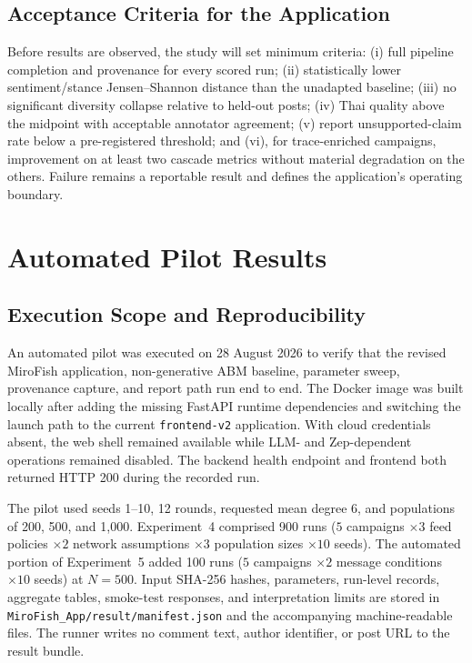 \documentclass[conference]{IEEEtran}
\begin{document}
\subsection{Acceptance Criteria for the Application}

Before results are observed, the study will set minimum criteria: (i) full
pipeline completion and provenance for every scored run; (ii) statistically
lower sentiment/stance Jensen--Shannon distance than the unadapted baseline;
(iii) no significant diversity collapse relative to held-out posts; (iv) Thai
quality above the midpoint with acceptable annotator agreement; (v) report
unsupported-claim rate below a pre-registered threshold; and (vi), for
trace-enriched campaigns, improvement on at least two cascade metrics without
material degradation on the others. Failure remains a reportable result and
defines the application's operating boundary.

\section{Automated Pilot Results}
\label{sec:pilot-results}

\subsection{Execution Scope and Reproducibility}

An automated pilot was executed on 28 August 2026 to verify that the revised
MiroFish application, non-generative ABM baseline, parameter sweep, provenance
capture, and report path run end to end. The Docker image was built locally
after adding the missing FastAPI runtime dependencies and switching the launch
path to the current \texttt{frontend-v2} application. With cloud credentials
absent, the web shell remained available while LLM- and Zep-dependent operations
remained disabled. The backend health endpoint and frontend both returned HTTP
200 during the recorded run.

The pilot used seeds 1--10, 12 rounds, requested mean degree 6, and populations
of 200, 500, and 1,000. Experiment~4 comprised 900 runs
($5$ campaigns $\times 3$ feed policies $\times 2$ network assumptions
$\times 3$ population sizes $\times 10$ seeds). The automated portion of
Experiment~5 added 100 runs ($5$ campaigns $\times 2$ message conditions
$\times 10$ seeds) at $N=500$. Input SHA-256 hashes, parameters, run-level
records, aggregate tables, smoke-test responses, and interpretation limits are
stored in \texttt{MiroFish\_App/result/manifest.json} and the accompanying
machine-readable files. The runner writes no comment text, author identifier,
or post URL to the result bundle.
\end{document}
